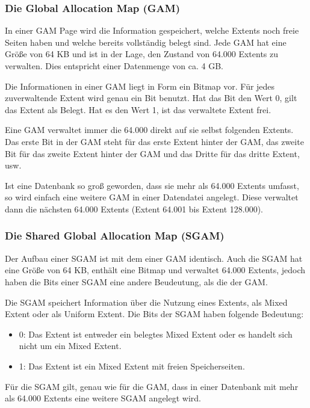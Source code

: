         \subsubsection{Die Global Allocation Map (GAM)}
          In einer GAM Page wird die Information gespeichert, welche Extents
          noch freie Seiten haben und welche bereits vollständig belegt sind.
          Jede GAM hat eine Größe von 64 KB und ist in der Lage, den
          Zustand von 64.000 Extents zu verwalten. Dies entspricht einer
          Datenmenge von ca. 4 GB.

          Die Informationen in einer GAM liegt in Form ein Bitmap vor. Für
          jedes zuverwaltende Extent wird genau ein Bit benutzt. Hat das Bit den
          Wert 0, gilt das Extent als Belegt. Hat es den Wert 1, ist das
          verwaltete Extent frei.

          Eine GAM verwaltet immer die 64.000 direkt auf sie selbst folgenden
          Extents. Das erste Bit in der GAM steht für das erste Extent
          hinter der GAM, das zweite Bit für das zweite Extent hinter der GAM
          und das Dritte für das dritte Extent, usw.

          Ist eine Datenbank so groß geworden, dass sie mehr als 64.000
          Extents umfasst, so wird einfach eine weitere GAM in einer Datendatei
          angelegt. Diese verwaltet dann die nächsten 64.000 Extents (Extent
          64.001 bis Extent 128.000).
        \subsubsection{Die Shared Global Allocation Map (SGAM)}
          Der Aufbau einer SGAM ist mit dem einer GAM identisch. Auch die SGAM
          hat eine Größe von 64 KB, enthält eine Bitmap und verwaltet
          64.000 Extents, jedoch haben die Bits einer SGAM eine andere
          Beudeutung, als die der GAM.

          Die SGAM speichert Information über die Nutzung eines Extents, als
          Mixed Extent oder als Uniform Extent. Die Bits der SGAM haben folgende
          Bedeutung:
          \begin{itemize}
            \item 0: Das Extent ist entweder ein belegtes Mixed Extent oder es
            handelt sich nicht um ein Mixed Extent.
            \item 1: Das Extent ist ein Mixed Extent mit freien Speicherseiten.
          \end{itemize}
          Für die SGAM gilt, genau wie für die GAM, dass in einer Datenbank
          mit mehr als 64.000 Extents eine weitere SGAM angelegt wird.
